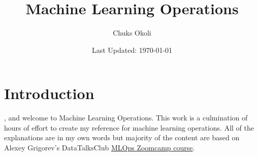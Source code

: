 \documentclass[letterpaper,12pt,notitlepage,twoside]{report}
\title{Machine Learning Operations}
\author{Chuks Okoli}
\date{\footnotesize Last Updated: \today}
\makeatletter
\newcommand{\booktopic}{Machine Learning Operations}
\newcommand*{\toccontents}{\@starttoc{toc}}
\makeatother
\begin{document}
\begin{titlepage}
  \pagestyle{plain}
  \maketitle
  \setcounter{tocdepth}{2}

  \toccontents
\end{titlepage}

\chapter{Introduction} \label{ch:1}

, and welcome to \booktopic. This work is a culmination of hours of effort to create my reference for machine learning operations. All of the explanations are in my own words but majority of the content are based on Alexey Grigorev's DataTalksClub \href{https://github.com/DataTalksClub/mlops-zoomcamp}{MLOps Zoomcamp course}.
\end{document}
